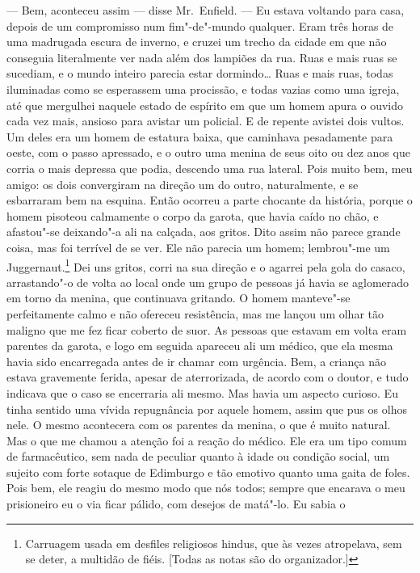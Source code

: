 --- Bem, aconteceu assim --- disse Mr.~Enfield. --- Eu estava voltando para
casa, depois de um compromisso num fim"-de"-mundo qualquer.  Eram três
horas de uma madrugada escura de inverno, e cruzei um trecho da cidade
em que não conseguia literalmente ver nada além dos lampiões da rua. 
Ruas e mais ruas se sucediam, e o mundo inteiro parecia estar
dormindo\ldots{} Ruas e mais ruas, todas iluminadas como se esperassem uma
procissão, e todas vazias como uma igreja, até que mergulhei naquele
estado de espírito em que um homem apura o ouvido cada vez mais,
ansioso para avistar um policial.  E de repente avistei dois vultos. 
Um deles era um homem de estatura baixa, que caminhava pesadamente para
oeste, com o passo apressado, e o outro uma menina de seus oito ou dez
anos que corria o mais depressa que podia, descendo uma rua lateral. 
Pois muito bem, meu amigo: os dois convergiram na direção um do outro,
naturalmente, e se esbarraram bem na esquina.  Então ocorreu a parte
chocante da história, porque o homem pisoteou calmamente o corpo da
garota, que havia caído no chão, e afastou"-se deixando"-a ali na
calçada, aos gritos.  Dito assim não parece grande coisa, mas foi
terrível de se ver.  Ele não parecia um homem; lembrou"-me um Juggernaut.\footnote{ Carruagem 
usada em desfiles religiosos hindus, que às vezes atropelava, sem se deter, a multidão de fiéis. 
[Todas as notas são do organizador.]} Dei uns gritos, corri na sua direção e o agarrei
pela gola do casaco, arrastando"-o de volta ao local onde um grupo de
pessoas já havia se aglomerado em torno da menina, que continuava
gritando.  O homem manteve"-se perfeitamente calmo e não ofereceu
resistência, mas me lançou um olhar tão maligno que me fez ficar
coberto de suor.  As pessoas que estavam em volta eram parentes da garota, e
logo em seguida apareceu ali um médico, que ela mesma havia sido
encarregada antes de ir chamar com urgência.  Bem, a criança não estava
gravemente ferida, apesar de aterrorizada, de acordo com o doutor, e
tudo indicava que o caso se encerraria ali mesmo.  Mas havia um aspecto
curioso.  Eu tinha sentido uma vívida repugnância por aquele homem,
assim que pus os olhos nele.  O mesmo acontecera com os parentes da
menina, o que é muito natural.  Mas o que me chamou a atenção foi a
reação do médico.  Ele era um tipo comum de farmacêutico, sem nada de
peculiar quanto à idade ou condição social, um sujeito com forte
sotaque de Edimburgo e tão emotivo quanto uma gaita de foles.  Pois
bem, ele reagiu do mesmo modo que nós todos; sempre que encarava o meu
prisioneiro eu o via ficar pálido, com desejos de matá"-lo.  Eu sabia o
